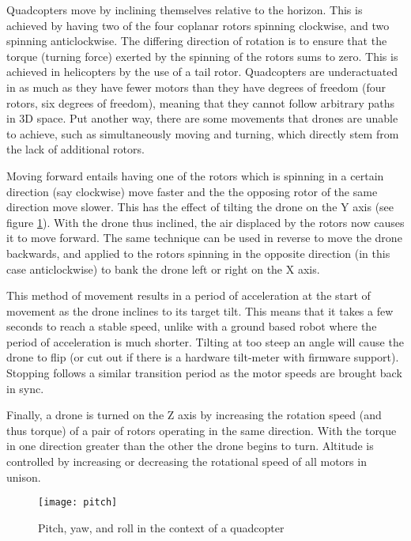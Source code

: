 \begin{aside}
\label{movement}
Quadcopters move by inclining themselves relative to the horizon. This is achieved by having two of the four coplanar rotors spinning clockwise, and two spinning anticlockwise. The differing direction of rotation is to ensure that the torque (turning force) exerted by the spinning of the rotors sums to zero. This is achieved in helicopters by the use of a tail rotor. Quadcopters are underactuated in as much as they have fewer motors than they have degrees of freedom (four rotors, six degrees of freedom), meaning that they cannot follow arbitrary paths in 3D space. Put another way, there are some movements that drones are unable to achieve, such as simultaneously moving and turning, which directly stem from the lack of additional rotors.

Moving forward entails having one of the rotors which is spinning in a certain direction (say clockwise) move faster and the the opposing rotor of the same direction move slower. This has the effect of tilting the drone on the Y axis (see figure \ref{pitch}). With the drone thus inclined, the air displaced by the rotors now causes it to move forward. The same technique can be used in reverse to move the drone backwards, and applied to the rotors spinning in the opposite direction (in this case anticlockwise) to bank the drone left or right on the X axis.

This method of movement results in a period of acceleration at the start of movement as the drone inclines to its target tilt. This means that it takes a few seconds to reach a stable speed, unlike with a ground based robot where the period of acceleration is much shorter. Tilting at too steep an angle will cause the drone to flip (or cut out if there is a hardware tilt-meter with firmware support). Stopping follows a similar transition period as the motor speeds are brought back in sync.

Finally, a drone is turned on the Z axis by increasing the rotation speed (and thus torque) of a pair of rotors operating in the same direction. With the torque in one direction greater than the other the drone begins to turn. Altitude is controlled by increasing or decreasing the rotational speed of all motors in unison.

\begin{figure}[H]
\centering
\texttt{[image: pitch]}
\caption{Pitch, yaw, and roll in the context of a quadcopter\cite{Hansen2014}}
\label{pitch}
\end{figure}
\end{aside}

